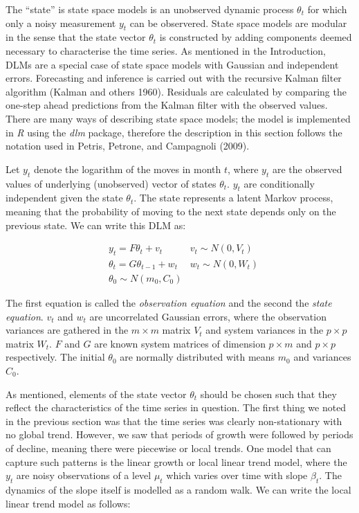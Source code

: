 \documentclass[]{article}
\begin{document}
The ``state'' is state space models is an unobserved dynamic process
\(\theta_{t}\) for which only a noisy measurement \(y_{t}\) can be
observered. State space models are modular in the sense that the state
vector \(\theta_{t}\) is constructed by adding components deemed
necessary to characterise the time series. As mentioned in the
Introduction, DLMs are a special case of state space models with
Gaussian and independent errors. Forecasting and inference is carried
out with the recursive Kalman filter algorithm (Kalman and others 1960).
Residuals are calculated by comparing the one-step ahead predictions
from the Kalman filter with the observed values. There are many ways of
describing state space models; the model is implemented in \emph{R}
using the \emph{dlm} package, therefore the description in this section
follows the notation used in Petris, Petrone, and Campagnoli (2009).

Let \(y_{t}\) denote the logarithm of the moves in month \(t\), where
\(y_{t}\) are the observed values of underlying (unobserved) vector of
states \(\theta_{t}\). \(y_{t}\) are conditionally independent given the
state \(\theta_{t}\). The state represents a latent Markov process,
meaning that the probability of moving to the next state depends only on
the previous state. We can write this DLM as:

\[
\begin{aligned}
& y_{t} = F \theta_{t} + v_{t} & v_{t} \sim N(0, V_{t}) \\
& \theta_{t} = G \theta_{t-1} + w_{t} &w_{t} \sim N(0, W_{t}) \\
& \theta_{0} \sim N(m_{0}, C_{0})
\end{aligned}
\]

The first equation is called the \emph{observation equation} and the
second the \emph{state equation}. \(v_{t}\) and \(w_{t}\) are
uncorrelated Gaussian errors, where the observation variances are
gathered in the \(m \times m\) matrix \(V_{t}\) and system variances in
the \(p \times p\) matrix \(W_{t}\). \(F\) and \(G\) are known system
matrices of dimension \(p \times m\) and \(p \times p\) respectively.
The initial \(\theta_{0}\) are normally distributed with means \(m_{0}\)
and variances \(C_{0}\).

As mentioned, elements of the state vector \(\theta_{t}\) should be
chosen such that they reflect the characteristics of the time series in
question. The first thing we noted in the previous section was that the
time series was clearly non-stationary with no global trend. However, we
saw that periods of growth were followed by periods of decline, meaning
there were piecewise or local trends. One model that can capture such
patterns is the linear growth or local linear trend model, where the
\(y_{t}\) are noisy observations of a level \(\mu_{t}\) which varies
over time with slope \(\beta_{t}\). The dynamics of the slope itself is
modelled as a random walk. We can write the local linear trend model as
follows:
\end{document}
